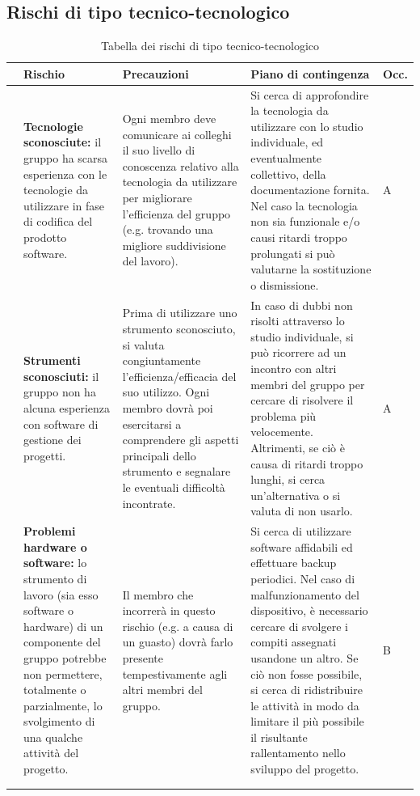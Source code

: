 \subsection{Rischi di tipo tecnico-tecnologico}\label{sec:analisi_rischi:tec}
\renewcommand{\arraystretch}{1.5}
\begin{xltabular}{\textwidth}{p{0.00001\textwidth} X | X | X | p{0.05\textwidth}}
    & \textbf{\color{white} Rischio} & \textbf{\color{white} Precauzioni} & \textbf{\color{white} Piano di contingenza} & \textbf{\color{white} Occ.}\\ 
    \hline
    \endhead
    
    & \textbf{Tecnologie sconosciute:} il gruppo ha scarsa esperienza con le tecnologie da utilizzare in fase di codifica del prodotto software. 
    & Ogni membro deve comunicare ai colleghi il suo livello di conoscenza relativo alla tecnologia da utilizzare per migliorare l'efficienza del gruppo (e.g. trovando una migliore suddivisione del lavoro).
    & Si cerca di approfondire la tecnologia da utilizzare con lo studio individuale, ed eventualmente collettivo, della documentazione fornita. Nel caso la tecnologia non sia funzionale e/o causi ritardi troppo prolungati si può valutarne la sostituzione o dismissione. 
    & A \\
    \hline
    
    & \textbf{Strumenti sconosciuti:} il gruppo non ha alcuna esperienza con software di gestione dei progetti. 
    & Prima di utilizzare uno strumento sconosciuto, si valuta congiuntamente l'efficienza/efficacia del suo utilizzo. Ogni membro dovrà poi esercitarsi a comprendere gli aspetti principali dello strumento e segnalare le eventuali difficoltà incontrate.
    & In caso di dubbi non risolti attraverso lo studio individuale, si può ricorrere ad un incontro con altri membri del gruppo per cercare di risolvere il problema più velocemente. Altrimenti, se ciò è causa di ritardi troppo lunghi, si cerca un'alternativa o si valuta di non usarlo. 
    & A \\
    \hline

    & \textbf{Problemi hardware o software:} lo strumento di lavoro (sia esso software o hardware) di un componente del gruppo potrebbe non permettere, totalmente o parzialmente, lo svolgimento di una qualche attività del progetto. 
    & Il membro che incorrerà in questo rischio (e.g. a causa di un guasto) dovrà farlo presente tempestivamente agli altri membri del gruppo.
    & Si cerca di utilizzare software affidabili ed effettuare backup periodici. Nel caso di malfunzionamento del dispositivo, è necessario cercare di svolgere i compiti assegnati usandone un altro. Se ciò non fosse possibile, si cerca di ridistribuire le attività in modo da limitare il più possibile il risultante rallentamento nello sviluppo del progetto.
    & B \\
    \hline \\

    \caption{Tabella dei rischi di tipo tecnico-tecnologico}
    \label{tab:rischi:tec}
\end{xltabular}

